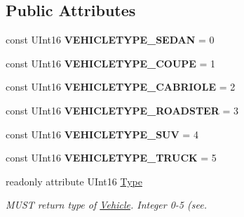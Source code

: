 \subsection*{Public Attributes}
\begin{DoxyCompactItemize}
\item 
\hypertarget{interfaceVehicle_1_1org_1_1automotive_1_1VehicleType_a1e16dd5061018df68af0cd96eeb299d9}{const U\-Int16 {\bfseries V\-E\-H\-I\-C\-L\-E\-T\-Y\-P\-E\-\_\-\-S\-E\-D\-A\-N} = 0}\label{interfaceVehicle_1_1org_1_1automotive_1_1VehicleType_a1e16dd5061018df68af0cd96eeb299d9}

\item 
\hypertarget{interfaceVehicle_1_1org_1_1automotive_1_1VehicleType_ad7f56c0476f5934b65ff0c460753317e}{const U\-Int16 {\bfseries V\-E\-H\-I\-C\-L\-E\-T\-Y\-P\-E\-\_\-\-C\-O\-U\-P\-E} = 1}\label{interfaceVehicle_1_1org_1_1automotive_1_1VehicleType_ad7f56c0476f5934b65ff0c460753317e}

\item 
\hypertarget{interfaceVehicle_1_1org_1_1automotive_1_1VehicleType_ab1e2b242a11c03d44e8ef020f9bd5738}{const U\-Int16 {\bfseries V\-E\-H\-I\-C\-L\-E\-T\-Y\-P\-E\-\_\-\-C\-A\-B\-R\-I\-O\-L\-E} = 2}\label{interfaceVehicle_1_1org_1_1automotive_1_1VehicleType_ab1e2b242a11c03d44e8ef020f9bd5738}

\item 
\hypertarget{interfaceVehicle_1_1org_1_1automotive_1_1VehicleType_a0c7972b5330a25d97cbf4bbc49608017}{const U\-Int16 {\bfseries V\-E\-H\-I\-C\-L\-E\-T\-Y\-P\-E\-\_\-\-R\-O\-A\-D\-S\-T\-E\-R} = 3}\label{interfaceVehicle_1_1org_1_1automotive_1_1VehicleType_a0c7972b5330a25d97cbf4bbc49608017}

\item 
\hypertarget{interfaceVehicle_1_1org_1_1automotive_1_1VehicleType_aa04240df0f0c9553d5150a1fbbe59fc6}{const U\-Int16 {\bfseries V\-E\-H\-I\-C\-L\-E\-T\-Y\-P\-E\-\_\-\-S\-U\-V} = 4}\label{interfaceVehicle_1_1org_1_1automotive_1_1VehicleType_aa04240df0f0c9553d5150a1fbbe59fc6}

\item 
\hypertarget{interfaceVehicle_1_1org_1_1automotive_1_1VehicleType_a98e51f8bb1c6f09b5719f59be937eba0}{const U\-Int16 {\bfseries V\-E\-H\-I\-C\-L\-E\-T\-Y\-P\-E\-\_\-\-T\-R\-U\-C\-K} = 5}\label{interfaceVehicle_1_1org_1_1automotive_1_1VehicleType_a98e51f8bb1c6f09b5719f59be937eba0}

\item 
readonly attribute U\-Int16 \hyperlink{interfaceVehicle_1_1org_1_1automotive_1_1VehicleType_a9c6dc007ca2a36b2cc392214078080f8}{Type}
\begin{DoxyCompactList}\small\item\em M\-U\-S\-T return type of \hyperlink{namespaceVehicle}{Vehicle}. Integer 0-\/5 (see. \end{DoxyCompactList}\end{DoxyCompactItemize}


